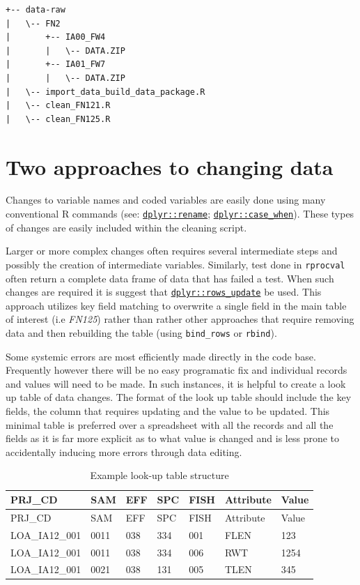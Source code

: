 \documentclass[
]{book}
\begin{document}
\begin{verbatim}
+-- data-raw
|   \-- FN2
|       +-- IA00_FW4
|       |   \-- DATA.ZIP
|       +-- IA01_FW7
|       |   \-- DATA.ZIP
|   \-- import_data_build_data_package.R
|   \-- clean_FN121.R
|   \-- clean_FN125.R
\end{verbatim}

\hypertarget{two-approaches-to-changing-data}{%
\section{Two approaches to changing data}\label{two-approaches-to-changing-data}}

Changes to variable names and coded variables are easily done using many conventional R commands (see: \href{https://dplyr.tidyverse.org/reference/rename.html}{\texttt{dplyr::rename}}; \href{https://dplyr.tidyverse.org/reference/case_when.html}{\texttt{dplyr::case\_when}}). These types of changes are easily included within the cleaning script.

Larger or more complex changes often requires several intermediate steps and possibly the creation of intermediate variables. Similarly, test done in \texttt{rprocval} often return a complete data frame of data that has failed a test. When such changes are required it is suggest that \href{https://dplyr.tidyverse.org/reference/rows.html}{\texttt{dplyr::rows\_update}} be used. This approach utilizes key field matching to overwrite a single field in the main table of interest (i.e \emph{FN125}) rather than rather other approaches that require removing data and then rebuilding the table (using \texttt{bind\_rows} or \texttt{rbind}).

Some systemic errors are most efficiently made directly in the code base. Frequently however there will be no easy programatic fix and individual records and values will need to be made. In such instances, it is helpful to create a look up table of data changes. The format of the look up table should include the key fields, the column that requires updating and the value to be updated. This minimal table is preferred over a spreadsheet with all the records and all the fields as it is far more explicit as to what value is changed and is less prone to accidentally inducing more errors through data editing.

\begin{longtable}[]{@{}lllllll@{}}
\caption{Example look-up table structure}\tabularnewline
\toprule
PRJ\_CD & SAM & EFF & SPC & FISH & Attribute & Value \\
\midrule
\endfirsthead
\toprule
PRJ\_CD & SAM & EFF & SPC & FISH & Attribute & Value \\
\midrule
\endhead
LOA\_IA12\_001 & 0011 & 038 & 334 & 001 & FLEN & 123 \\
LOA\_IA12\_001 & 0011 & 038 & 334 & 006 & RWT & 1254 \\
LOA\_IA12\_001 & 0021 & 038 & 131 & 005 & TLEN & 345 \\
\bottomrule
\end{longtable}
\end{document}
